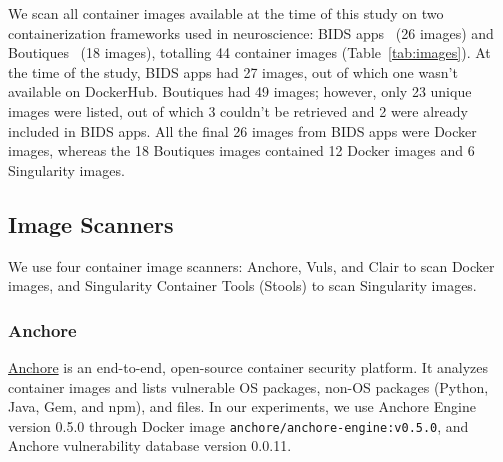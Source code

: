 We scan all container images available at the time of this study on two containerization frameworks
used in neuroscience: BIDS
apps~\cite{gorgolewski2017bids} (26 images) and Boutiques~\cite{glatard2018boutiques} (18 images),
totalling
44 container images (Table~\ref{tab:images}). At the time of the study, BIDS apps had 27 images,
out of which one wasn't available on DockerHub. Boutiques had 49 images;
however, only 23 unique images were listed, out of which 3 couldn't be retrieved and 2
were already included in BIDS apps. All the final 26 images
from BIDS apps were Docker images, whereas the 18 Boutiques images contained 12 Docker images
and 6 Singularity images.

\subsection{Image Scanners}

We use four container image scanners: Anchore, Vuls, and
Clair to scan Docker images, and Singularity Container Tools
(Stools) to scan Singularity images.

\subsubsection{Anchore}

\href{https://github.com/anchore/anchore-engine}{Anchore} is an end-to-end, open-source container security platform. It
analyzes container images and lists vulnerable OS
packages, non-OS packages (Python, Java, Gem, and npm), and files.
In our experiments, we use Anchore Engine version 0.5.0 through Docker image \texttt{anchore/anchore-engine:v0.5.0}, and
Anchore vulnerability database version 0.0.11.
\newline
%

